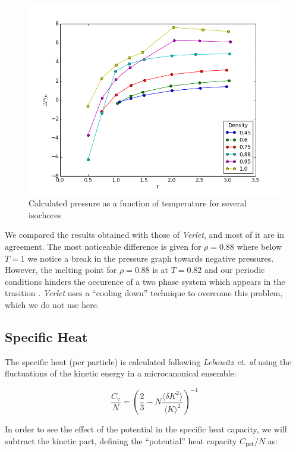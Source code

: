 \documentclass[aps,prl,reprint,groupedaddress]{revtex4-1}
\begin{document}
\begin{figure}[ht]
	\includegraphics[scale=0.4]{pressure.png}
	\caption{Calculated pressure as a function of temperature for  several isochores\label{press_graph}}
\end{figure}

We compared the results obtained  with those of \textit{Verlet}, and most of it are in agreement. The most noticeable difference is given for $\rho = 0.88$ where below $T=1$ we notice a break in the pressure graph towards negative pressures. However, the melting point for $\rho = 0.88$ is at $T=0.82$ and our periodic conditions hinders the occurence of a two phase system which appears in the trasition \cite{Verlet1967}. \textit{Verlet} uses a ``cooling down'' technique to overcome this problem, which we do not use here.

\subsection{Specific Heat}

The specific heat (per particle) is calculated following \textit{Lebowitz et. al} \cite{Lebowitz1967} using the fluctuations of the kinetic energy in a microcanonical ensemble:

\begin{equation}
  \frac{C_v}{N} = \left(\frac{2}{3} - N\frac{\langle \delta K^2 \rangle}{\langle K \rangle^2} \right)^{-1}
\end{equation}

In order to see the effect of the potential in the specific heat capacity, we will subtract the kinetic part, defining the ``potential'' heat capacity $C_{\text{pot}}/N$ as:
\end{document}
